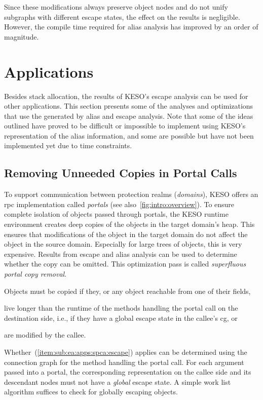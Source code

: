 				Since these modifications always preserve object nodes and do not unify subgraphs with different escape states,
				the effect on the results is negligible. However, the compile time required for alias analysis has improved by
				an order of magnitude.

	\section{Applications}
		\label{sec:ea:apps}
		Besides stack allocation, the results of KESO's escape analysis can be used for other applications. This section
		presents some of the analyses and optimizations that use the  generated by alias and escape analysis.
		Note that some of the ideas outlined have proved to be difficult or impossible to implement using KESO's
		representation of the alias information, and some are possible but have not been implemented yet due to time
		constraints.

		\subsection{Removing Unneeded Copies in Portal Calls}
			\label{sub:ea:apps:spca}
			To support communication between protection realms (\emph{domains}), KESO offers an \gls{rpc} implementation
			called \emph{portals} (see also~\cref{fig:intro:overview}). To ensure complete isolation of objects passed through
			portals, the KESO runtime environment creates deep copies of the objects in the target domain's heap. This ensures
			that modifications of the object in the target domain do not affect the object in the source domain. Especially
			for large trees of objects, this is very expensive. Results from escape and alias analysis can be used to
			determine whether the copy can be omitted. This optimization pass is called \emph{superfluous portal copy
			removal}.

			Objects must be copied if they, or any object reachable from one of their fields, \begin{inparaenum}[(a)]
				\item live longer than the runtime of the methods handling the portal call on the destination side, i.e., if
					they have a global escape state in the callee's \gls{cg}, or \label{item:sub:ea:apps:spca:escape}
				\item are modified by the callee. \label{item:sub:ea:apps:spca:write}
			\end{inparaenum} Whether~(\ref{item:sub:ea:apps:spca:escape}) applies can be determined using the connection graph
			for the method handling the portal call. For each argument passed into a portal, the corresponding representation
			on the callee side and its descendant nodes must not have a \emph{global} escape state. A simple work list
			algorithm suffices to check for globally escaping objects.

